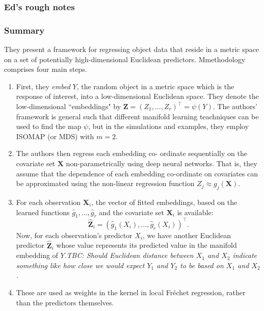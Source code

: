 

\subsubsection*{Ed's rough notes}
\subsubsection*{Summary}

They present a framework for regressing object data that reside in a metric space on a set of potentially high-dimensional Euclidean predictors. Mmethodology comprises four main steps.

\begin{enumerate}
  \item First, they \emph{embed} $Y$, the random object in a metric space which is the
  response of interest, into a low-dimensional Euclidean space. 
  They denote the low-dimensional ``embeddings" by $\mathbf{Z}= (Z_1,\dots, Z_r)^\top=\psi(Y)$.
  The authors' framework is general such that different manifold learning teachniques can be used to find the map $\psi$, but in the simulations and examples, they employ ISOMAP (or MDS) with $m=2$. 
  
  \item The authors then regress each embedding co-
  ordinate sequentially on the covariate set $\mathbf{X}$ non-parametrically using deep neural networks. That is, they assume that the dependence of each embedding co-ordinate on covariates can be approximated using the non-linear regression function $Z_j \approx g_j(\mathbf{X})$.
  
  \item For each observation $\mathbf{X}_i$, the vector of fitted embeddings, based on the learned functions $\widehat{g}_1, \dots, \widehat{g}_r$ and the covariate set $\mathbf{X}_i$ is available:
  $$
  \widehat{\mathbf{Z}}_i = (\widehat{g}_1(X_i), \dots, \widehat{g}_r(X_i))^\top.
  $$
  Now, for each observation's predictor $X_i$, we have another Euclidean predictor $\widehat{\mathbf{Z}}_i$ whose value represents its predicted value in the manifold embedding of $Y$.\emph{\color{blue}TBC: Should Euclidean distance between $X_1$ and $X_2$ indicate something like how close we would expect $Y_1$ and $Y_2$ to be based on $X_1$ and $X_2$.}
  
\item These are used as weights in the kernel in local Fr\'echet regression, rather than the predictors themselves.

\end{enumerate}


